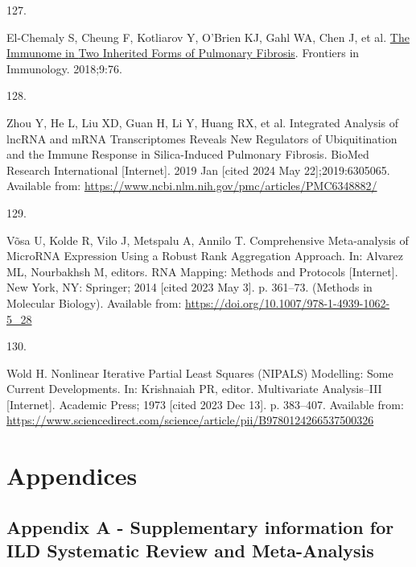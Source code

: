 \documentclass[
]{article}
\newlength{\cslhangindent}
\newlength{\csllabelwidth}
\newenvironment{CSLReferences}[2] %
 {\begin{list}{}{%
  \setlength{\itemindent}{0pt}
  \setlength{\leftmargin}{0pt}
  \setlength{\parsep}{0pt}
  \ifodd #1
   \setlength{\leftmargin}{\cslhangindent}
   \setlength{\itemindent}{-1\cslhangindent}
  \fi
  \setlength{\itemsep}{#2\baselineskip}}}
 {\end{list}}
\newcommand{\CSLLeftMargin}[1]{\parbox[t]{\csllabelwidth}{\strut#1\strut}}
\newcommand{\CSLRightInline}[1]{\parbox[t]{\linewidth - \csllabelwidth}{\strut#1\strut}}
\begin{document}
\begin{CSLReferences}{0}{1}
\CSLLeftMargin{127. }%
\CSLRightInline{El-Chemaly S, Cheung F, Kotliarov Y, O'Brien KJ, Gahl WA, Chen J, et al. \href{https://doi.org/10.3389/fimmu.2018.00076}{The {Immunome} in {Two} {Inherited} {Forms} of {Pulmonary} {Fibrosis}}. Frontiers in Immunology. 2018;9:76. }

\CSLLeftMargin{128. }%
\CSLRightInline{Zhou Y, He L, Liu XD, Guan H, Li Y, Huang RX, et al. Integrated {Analysis} of {lncRNA} and {mRNA} {Transcriptomes} {Reveals} {New} {Regulators} of {Ubiquitination} and the {Immune} {Response} in {Silica}-{Induced} {Pulmonary} {Fibrosis}. BioMed Research International {[}Internet{]}. 2019 Jan {[}cited 2024 May 22{]};2019:6305065. Available from: \url{https://www.ncbi.nlm.nih.gov/pmc/articles/PMC6348882/}}

\CSLLeftMargin{129. }%
\CSLRightInline{Võsa U, Kolde R, Vilo J, Metspalu A, Annilo T. Comprehensive {Meta}-analysis of {MicroRNA} {Expression} {Using} a {Robust} {Rank} {Aggregation} {Approach}. In: Alvarez ML, Nourbakhsh M, editors. {RNA} {Mapping}: {Methods} and {Protocols} {[}Internet{]}. New York, NY: Springer; 2014 {[}cited 2023 May 3{]}. p. 361--73. (Methods in {Molecular} {Biology}). Available from: \url{https://doi.org/10.1007/978-1-4939-1062-5_28}}

\CSLLeftMargin{130. }%
\CSLRightInline{Wold H. Nonlinear {Iterative} {Partial} {Least} {Squares} ({NIPALS}) {Modelling}: {Some} {Current} {Developments}. In: Krishnaiah PR, editor. Multivariate {Analysis}--{III} {[}Internet{]}. Academic Press; 1973 {[}cited 2023 Dec 13{]}. p. 383--407. Available from: \url{https://www.sciencedirect.com/science/article/pii/B9780124266537500326}}

\end{CSLReferences}

\clearpage

\setlength{\parindent}{4em} 
\linespread{1}
\doublespacing

\section*{Appendices}

\setcounter{secnumdepth}{0}

\subsection{Appendix A - Supplementary information for ILD Systematic Review and Meta-Analysis}\label{appendix-a---supplementary-information-for-ild-systematic-review-and-meta-analysis}
\end{document}
